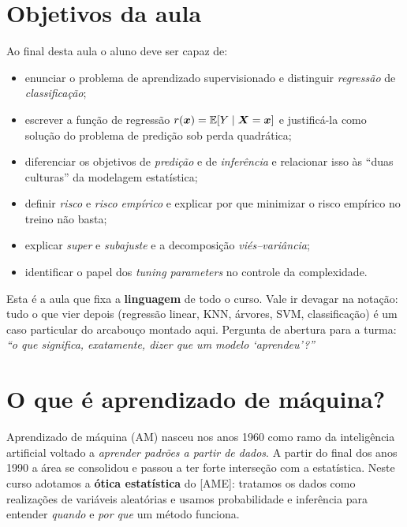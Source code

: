 \documentclass[11pt,a4paper]{article}
\title{}
\date{}
\begin{document}

\section*{Objetivos da aula}
Ao final desta aula o aluno deve ser capaz de:
\begin{itemize}[leftmargin=1.4cm]
  \item enunciar o problema de aprendizado supervisionado e distinguir
        \emph{regressão} de \emph{classificação};
  \item escrever a função de regressão $r(\bm{x})=\mathbb{E}[Y\mid\bm{X}=\bm{x}]$ e justificá-la como
        solução do problema de predição sob perda quadrática;
  \item diferenciar os objetivos de \emph{predição} e de \emph{inferência} e
        relacionar isso às ``duas culturas'' da modelagem estatística;
  \item definir \emph{risco} e \emph{risco empírico} e explicar por que minimizar o
        risco empírico no treino não basta;
  \item explicar \emph{super} e \emph{subajuste} e a decomposição
        \emph{viés--variância};
  \item identificar o papel dos \emph{tuning parameters} no controle da
        complexidade.
\end{itemize}

\begin{emsala}
Esta é a aula que fixa a \textbf{linguagem} de todo o curso. Vale ir devagar na
notação: tudo o que vier depois (regressão linear, KNN, árvores, SVM,
classificação) é um caso particular do arcabouço montado aqui. Pergunta de
abertura para a turma: \emph{``o que significa, exatamente, dizer que um modelo
`aprendeu'?''}
\end{emsala}

\section{O que é aprendizado de máquina?}
Aprendizado de máquina (AM) nasceu nos anos 1960 como ramo da inteligência
artificial voltado a \emph{aprender padrões a partir de dados}. A partir do final
dos anos 1990 a área se consolidou e passou a ter forte interseção com a
estatística. Neste curso adotamos a \textbf{ótica estatística} do [AME]: tratamos
os dados como realizações de variáveis aleatórias e usamos probabilidade e
inferência para entender \emph{quando} e \emph{por que} um método funciona.
\end{document}
